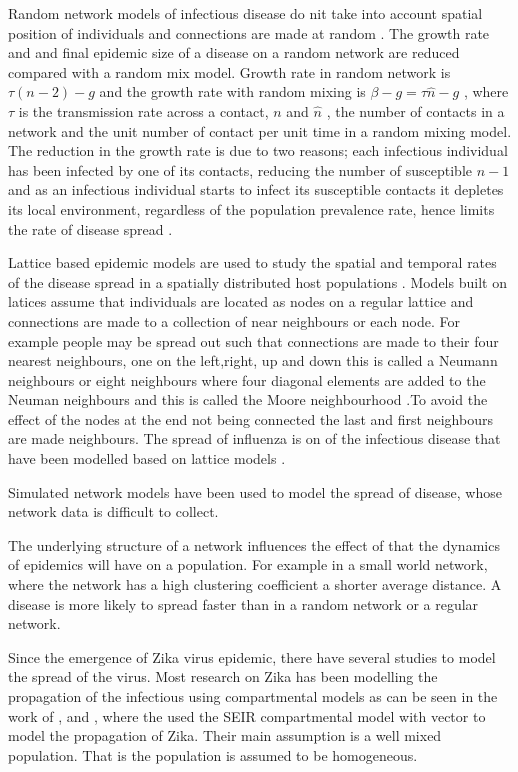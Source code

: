 Random network models of infectious disease do nit take into account spatial position of individuals and connections are made at random \citep{keeling2005networks}. The growth rate and and final epidemic size of a disease on a random network are reduced compared with a random mix model. Growth rate in random network is $\tau (n -2) -g$ and the growth rate with random mixing is $\beta -g = \tau \widehat{n} -g$ , where  $\tau$ is the transmission rate across a contact, $n$ and $\widehat{n} $ , the number of contacts in a network and the unit number of contact per unit time in a random mixing model. The reduction in the growth rate is due to two reasons; each infectious individual has been infected by one of its contacts, reducing the number of susceptible $n-1$ and as an infectious individual starts to infect its susceptible contacts it depletes its local environment, regardless of the population prevalence rate, hence limits the rate of disease spread \citep{keeling2005networks}.

Lattice based epidemic models are used to study the spatial and temporal rates of the disease spread in  a spatially distributed host populations \citep{rhodes1997epidemic}. Models built on latices assume that individuals are located as nodes on a regular lattice and connections are made to a collection of near neighbours or each node. For example people may be spread out such that connections are made to their four nearest neighbours, one on the left,right, up and down this is called a Neumann neighbours  or eight neighbours where four diagonal elements are added to the Neuman neighbours and this is called the Moore neighbourhood \citep{lloyd2006infection}.To avoid the effect of the nodes at the end not being connected the last and first neighbours are made neighbours. The spread of influenza is on of the infectious disease that have been modelled based on lattice models \cite{liccardo2013lattice}. 

Simulated network models have been used to model the spread of disease, whose network data is difficult to collect.


 The underlying structure of a network influences  the effect of that the dynamics of epidemics will have on a population. For example in a small world network, where the network has a high clustering coefficient a shorter average distance. A disease is more likely to spread faster than in a random network or a regular network.


Since the emergence of Zika virus epidemic, there have several studies to model the spread of the virus. Most research on Zika has been modelling the propagation of the infectious using compartmental models as can be seen in the work of \cite{1}, \cite{2} and \cite{3}, where the used the SEIR compartmental model with vector to model the propagation of Zika. Their main assumption is a well mixed population. That is the population is assumed to be homogeneous.
 
